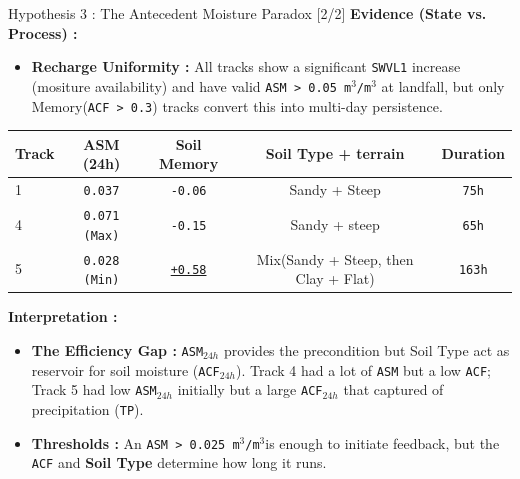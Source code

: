 \begin{frame}{Hypothesis 3 : The Antecedent Moisture Paradox [2/2]}
	\footnotesize
	\textbf{Evidence (State vs. Process) :}
	\begin{itemize}
		\item \textbf{Recharge Uniformity :} All tracks show a significant \texttt{SWVL1} increase (mositure availability) and have valid \texttt{ASM > 0.05 m$^3$/m$^3$} at landfall, but only Memory(\texttt{ACF > 0.3}) tracks convert this into multi-day persistence.
	\end{itemize}

	\vspace{0.1cm}
	\begin{center}
		\begin{tabular}{lcccc}
			\toprule
			\textbf{Track} & \textbf{ASM (24h)}   & \textbf{Soil Memory}       & \textbf{Soil Type + terrain}         & \textbf{Duration} \\
			\midrule
			1              & \texttt{0.037}       & \texttt{-0.06}             & Sandy + Steep                        & \texttt{75h}      \\
			4              & \texttt{0.071 (Max)} & \texttt{-0.15}             & Sandy + steep                        & \texttt{65h}      \\
			5              & \texttt{0.028 (Min)} & \underline{\texttt{+0.58}} & Mix(Sandy + Steep, then Clay + Flat) & \texttt{163h}     \\
			\bottomrule
		\end{tabular}
	\end{center}

	\vspace{0.1cm}
	\footnotesize
	\textbf{Interpretation :}
	\begin{itemize}
		\item \textbf{The Efficiency Gap :} \texttt{ASM$_{24h}$} provides the precondition but Soil Type act as reservoir for soil moisture (\texttt{ACF$_{24h}$}). Track 4 had a lot of \texttt{ASM} but a low \texttt{ACF}; Track 5 had low \texttt{ASM$_{24h}$} initially but a large \texttt{ACF$_{24h}$} that captured of precipitation (\texttt{TP}).
		\item \textbf{Thresholds :} An \texttt{ASM > 0.025 m$^3$/m$^3$}\footnotemark[7] is enough to initiate feedback, but the \texttt{ACF} and \textbf{Soil Type} determine how long it runs.
	\end{itemize}

	\vfill
\end{frame}

